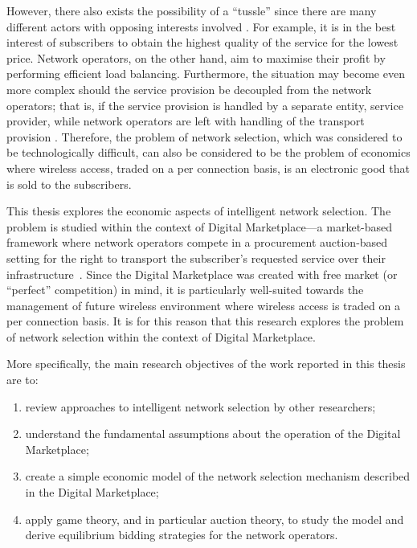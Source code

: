 However, there also exists the possibility of a ``tussle'' since there are many different actors with opposing interests involved \cite{Clark02}. For example, it is in the best interest of subscribers to obtain the highest quality of the service for the lowest price. Network operators, on the other hand, aim to maximise their profit by performing efficient load balancing. Furthermore, the situation may become even more complex should the service provision be decoupled from the network operators; that is, if the service provision is handled by a separate entity, service provider, while network operators are left with handling of the transport provision \cite{DMBushTussle09}. Therefore, the problem of network selection, which was considered to be technologically difficult, can also be considered to be the problem of economics where wireless access, traded on a per connection basis, is an electronic good that is sold to the subscribers.

This thesis explores the economic aspects of intelligent network selection. The problem is studied within the context of Digital Marketplace---a market-based framework where network operators compete in a procurement auction-based setting for the right to transport the subscriber's requested service over their infrastructure~\cite{DMLeBodic00}. Since the Digital Marketplace was created with free market (or ``perfect'' competition) in mind, it is particularly well-suited towards the management of future wireless environment where wireless access is traded on a per connection basis. It is for this reason that this research explores the problem of network selection within the context of Digital Marketplace.

More specifically, the main research objectives of the work reported in this thesis are to:
\begin{enumerate}
\item review approaches to intelligent network selection by other researchers;
\item understand the fundamental assumptions about the operation of the Digital Marketplace;
\item create a simple economic model of the network selection mechanism described in the Digital Marketplace;
\item apply game theory, and in particular auction theory, to study the model and derive equilibrium bidding strategies for the network operators.
\end{enumerate}


